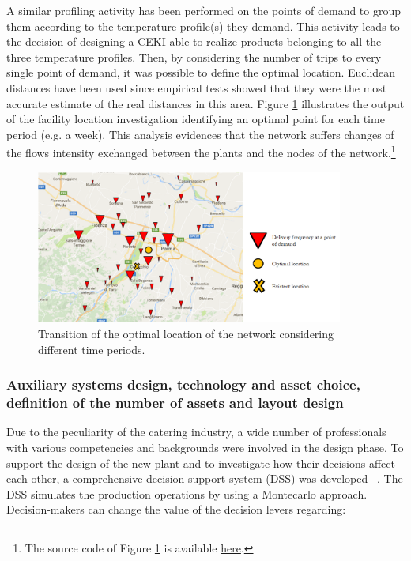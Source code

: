 A similar profiling activity has been performed on the points of demand to group them according to the temperature profile(s) they demand. This activity leads to the decision of designing a CEKI able to realize products belonging to all the three temperature profiles. Then, by considering the number of trips to every single point of demand, it was possible to define the optimal location. Euclidean distances have been used since empirical tests showed that they were the most accurate estimate of the real distances in this area. Figure \ref{fig_prod_CAMST_ubicazione} illustrates the output of the facility location investigation identifying an optimal point for each time period (e.g. a week). This analysis evidences that the network suffers changes of the flows intensity exchanged between the plants and the nodes of the network.\footnote{The source code of Figure \ref{fig_prod_CAMST_ubicazione} is available \href{https://github.com/aletuf93/logproj/blob/master/examples/PROD_01\%20Facility\%20location.ipynb}{here}.}

\begin{figure}[hbt!]
\centering
\includegraphics[width=0.9\textwidth]{sectionProduction/design_plant_figures/fig_prod_CAMST_ubicazione.png}
\captionsetup{type=figure}
\caption{Transition of the optimal location of the network considering different time periods.}
\label{fig_prod_CAMST_ubicazione}
\end{figure}

\subsubsection{Auxiliary systems design, technology and asset choice, definition of the number of assets and layout design}

Due to the peculiarity of the catering industry, a wide number of professionals with various competencies and backgrounds were involved in the design phase. To support the design of the new plant and to investigate how their decisions affect each other, a comprehensive decision support system (DSS) was developed ~\cite{Tufano2018_cekiDesign}. The DSS simulates the production operations by using a Montecarlo approach. Decision-makers can change the value of the decision levers regarding:


